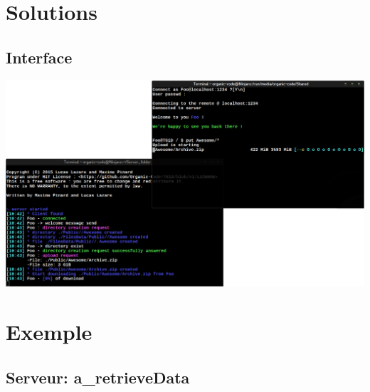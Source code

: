 \documentclass[11pt]{beamer}
\begin{document}
\section{Solutions}


	\subsection*{Interface}

		\begin{frame}
			\includegraphics[width=\linewidth]{interface}
		\end{frame}

\section{Exemple}
	\subsection*{Serveur: a\_retrieveData}

		\begin{frame}
			
		\end{frame}

		\begin{frame}
			
		\end{frame}

		\begin{frame}
			
		\end{frame}

		\begin{frame}
			
		\end{frame}

		\begin{frame}
			
		\end{frame}
\end{document}
